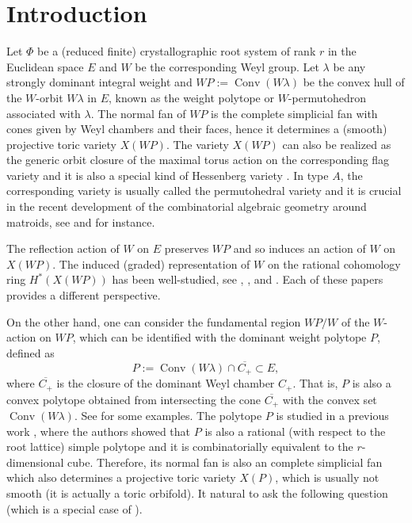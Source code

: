 \documentclass{amsart}
\theoremstyle{definition}
\theoremstyle{remark}
\numberwithin{equation}{section}
\begin{document}
\setcounter{tocdepth}{2}

\section{Introduction}

Let $\Phi$ be a (reduced finite) crystallographic root system of rank $r$ in the Euclidean space $E$ and $W$ be the corresponding Weyl group. Let $\lambda$ be any strongly dominant integral weight and $\mathit{WP}:=\operatorname{Conv} (W \lambda)$ be the convex hull of the $W$-orbit $W \lambda$ in $E$, known as the weight polytope or $W$-permutohedron associated with $\lambda$. The normal fan of $\mathit{WP}$ is the complete simplicial fan with cones given by Weyl chambers and their faces, hence it determines a (smooth) projective toric variety $X(\mathit{WP})$. The variety $X(\mathit{WP})$ can also be realized as the generic orbit closure of the maximal torus action on the corresponding flag variety \cite{klyachko1985orbits} and it is also a special kind of Hessenberg variety \cite{de1992hessenberg}. In type $A$, the corresponding variety is usually called the permutohedral variety and it is crucial in the recent development of the combinatorial algebraic geometry around matroids, see \cite{huh2014rota} and \cite{baker2018hodge} for instance.

The reflection action of $W$ on $E$ preserves $\mathit{WP}$ and so induces an action of $W$ on $X(\mathit{WP})$. The induced (graded) representation of $W$ on the rational cohomology ring $H^*\left(X(\mathit{WP})\right)$ has been well-studied, see \cite{Procesi90}, \cite{stembridge1994some}, \cite{dolgachev1994character} and \cite{lehrer2008rational}. Each of these papers provides a different perspective. 

On the other hand, one can consider the fundamental region $\mathit{WP} / W$ of the $W$-action on $\mathit{WP}$, which can be identified with the dominant weight polytope $P$, defined as 
\begin{equation*}
       P := \operatorname{Conv} (W \lambda) \cap \overline{C_+} \subset E, 
\end{equation*}
where $\overline{C_+}$ is the closure of the dominant Weyl chamber $C_+$. That is, $P$ is also a convex polytope obtained from intersecting the cone $\overline{C_+}$ with the convex set $\operatorname{Conv} (W \lambda)$. See \cite[fig.\ 1]{BGHpolytope} for some examples.
The polytope $P$ is studied in a previous work \cite{BGHpolytope}, where the authors showed that $P$ is also a rational (with respect to the root lattice) simple polytope and it is combinatorially equivalent to the $r$-dimensional cube. Therefore, its normal fan is also an complete simplicial fan which also determines a projective toric variety $X(P)$, which is usually not smooth (it is actually a toric orbifold). It natural to ask the following question (which is a special case of \cite[Question 8.3]{HMSS21-toric-orbifolds}).
\end{document}
